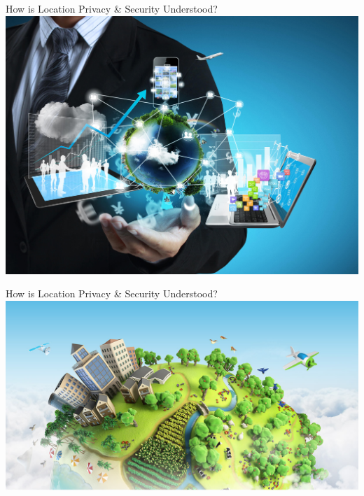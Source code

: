 \documentclass[10pt]{beamer}
\begin{document}
	\begin{frame}{How is Location Privacy \& Security Understood?}
		\includegraphics[width=\textwidth]{figures/tech.jpg}
	\end{frame}

	\begin{frame}{How is Location Privacy \& Security Understood?}
		\includegraphics[width=\textwidth]{figures/gis.jpg}
	\end{frame}
\end{document}
